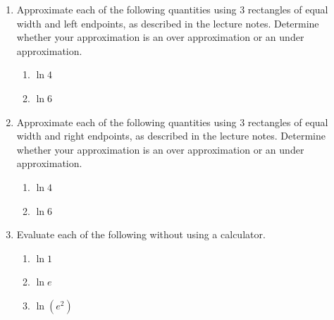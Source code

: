 \documentclass[12pt]{article}
\newif\ifans
\begin{document}
\begin{enumerate}

\item Approximate each of the following quantities using 3 rectangles of equal width and left endpoints, as described in the lecture notes.  Determine whether your approximation is an over approximation or an under approximation.

\begin{enumerate}

\item $\ln{4}$

\ifans\fbox{1.833333333; over approximation}\fi

\item $\ln{6}$

\ifans\fbox{2.676282051; over approximation}\fi

\end{enumerate}

\item Approximate each of the following quantities using 3 rectangles of equal width and right endpoints, as described in the lecture notes.   Determine whether your approximation is an over approximation or an under approximation.

\begin{enumerate}

\item $\ln{4}$

\ifans{\fbox{1.083333333; under approximation}}\fi

\item $\ln{6}$

\ifans{\fbox{1.287393162; under approximation}}\fi

\end{enumerate}

\newpage

\item Evaluate each of the following without using a calculator.

\begin{enumerate}

\item $\ln{1}$

\ifans\fbox{0}\fi

\item $\ln{e}$

\ifans\fbox{1}\fi

\item $\ln(e^2)$

\ifans\fbox{2}\fi


\end{enumerate}
\end{enumerate}
\end{document}
